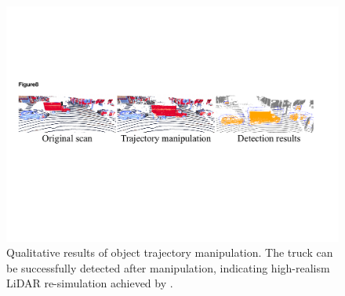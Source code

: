 \begin{figure}[t]
    \includegraphics[width=1.0\columnwidth]{Figures/trajectory_manipulation.pdf}
    
    \caption{Qualitative results of object trajectory manipulation. The truck can be successfully detected after manipulation, indicating high-realism LiDAR re-simulation achieved by \dynfl.}
    \label{fig:traj}
    
\end{figure}